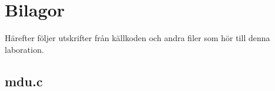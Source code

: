 \documentclass[a4paper, 12pt]{article}
\begin{document}
\newpage
\appendix
{}
\section{Bilagor}\label{Bilagor}
Härefter följer utskrifter från källkoden och andra filer som hör till
denna laboration.

\newpage
\subsection{mdu.c}\label{mdu.c}
\begin{scriptsize}
  
\end{scriptsize}
\end{document}
